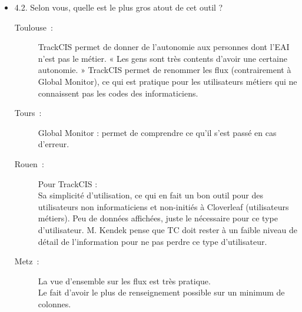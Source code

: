 \begin{itemize}
	  \item 4.2. Selon vous, quelle est le plus gros atout de cet outil ?
	  \begin{description}
	  	\item[Toulouse~:] TrackCIS permet de donner de l’autonomie aux personnes dont
	  	l’EAI n’est pas le métier. « Les gens sont très contents d’avoir une
	  	certaine autonomie. » TrackCIS permet de renommer les flux (contrairement à
	  	Global Monitor), ce qui est pratique pour les utilisateurs métiers qui ne
	  	connaissent pas les codes des informaticiens.
	  	\item[Tours~:] Global Monitor : permet de comprendre ce qu’il s’est passé en
	  	cas d’erreur.
	  	\item[Rouen~:] Pour TrackCIS : \\
		Sa simplicité d’utilisation, ce qui en fait un bon outil pour des utilisateurs
		non informaticiens et non-initiés à Cloverleaf (utilisateurs métiers). Peu de
		données affichées, juste le nécessaire pour ce type d’utilisateur. M. Kendek
		pense que TC doit rester à un faible niveau de détail de l’information pour ne
		pas perdre ce type d’utilisateur.
	  	\item[Metz~:] La vue d’ensemble sur les flux est très pratique.\\
		Le fait d’avoir le plus de renseignement possible sur un minimum de colonnes.
	  \end{description}
	  

\end{itemize}
